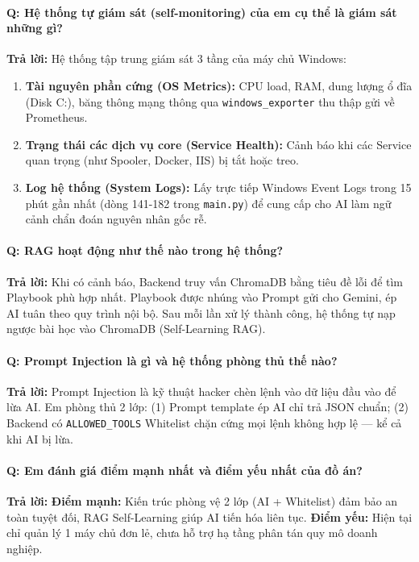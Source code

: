 \documentclass[12pt,a4paper]{article}
\begin{document}
\paragraph{Q: Hệ thống tự giám sát (self-monitoring) của em cụ thể là giám sát những gì?}
\textbf{Trả lời:} Hệ thống tập trung giám sát 3 tầng của máy chủ Windows:
\begin{enumerate}
    \item \textbf{Tài nguyên phần cứng (OS Metrics):} CPU load, RAM, dung lượng ổ đĩa (Disk C:), băng thông mạng thông qua \texttt{windows\_exporter} thu thập gửi về Prometheus.
    \item \textbf{Trạng thái các dịch vụ core (Service Health):} Cảnh báo khi các Service quan trọng (như Spooler, Docker, IIS) bị tắt hoặc treo.
    \item \textbf{Log hệ thống (System Logs):} Lấy trực tiếp Windows Event Logs trong 15 phút gần nhất (dòng 141-182 trong \texttt{main.py}) để cung cấp cho AI làm ngữ cảnh chẩn đoán nguyên nhân gốc rễ.
\end{enumerate}

\paragraph{Q: RAG hoạt động như thế nào trong hệ thống?}
\textbf{Trả lời:} Khi có cảnh báo, Backend truy vấn ChromaDB bằng tiêu đề lỗi để tìm Playbook phù hợp nhất. Playbook được nhúng vào Prompt gửi cho Gemini, ép AI tuân theo quy trình nội bộ. Sau mỗi lần xử lý thành công, hệ thống tự nạp ngược bài học vào ChromaDB (Self-Learning RAG).

\paragraph{Q: Prompt Injection là gì và hệ thống phòng thủ thế nào?}
\textbf{Trả lời:} Prompt Injection là kỹ thuật hacker chèn lệnh vào dữ liệu đầu vào để lừa AI. Em phòng thủ 2 lớp: (1) Prompt template ép AI chỉ trả JSON chuẩn; (2) Backend có \texttt{ALLOWED\_TOOLS} Whitelist chặn cứng mọi lệnh không hợp lệ — kể cả khi AI bị lừa.

\paragraph{Q: Em đánh giá điểm mạnh nhất và điểm yếu nhất của đồ án?}
\textbf{Trả lời:} \textbf{Điểm mạnh:} Kiến trúc phòng vệ 2 lớp (AI + Whitelist) đảm bảo an toàn tuyệt đối, RAG Self-Learning giúp AI tiến hóa liên tục. \textbf{Điểm yếu:} Hiện tại chỉ quản lý 1 máy chủ đơn lẻ, chưa hỗ trợ hạ tầng phân tán quy mô doanh nghiệp.
\end{document}
